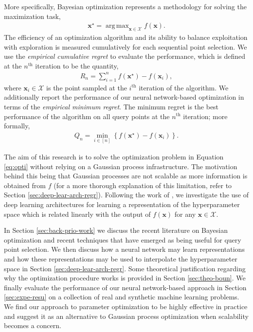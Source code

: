 \documentclass[]{article}
\DeclareMathOperator*{\argmax}{arg\,max}
\newcommand{\paren}[1]{\left({#1}\right)}
\newcommand{\brac}[1]{\left[{#1}\right]}
\newcommand{\set}[1]{\left\{{#1}\right\}}
\newcommand{\1}{\mathbf{1}}
\newcommand{\0}{\mathbf{0}}
\newcommand{\X}{\mathcal{X}}
\newcommand{\x}{\mathbf{x}}
\begin{document}
More specifically, Bayesian optimization represents a methodology for solving the maximization task,
\begin{eqnarray}
	\label{eq:opti}
	\x^\star = \argmax_{\x\in\X} f\paren{\x}.
\end{eqnarray}
The efficiency of an optimization algorithm and its ability to balance exploitation with exploration is measured cumulatively for each sequential point selection. We use the \textit{empirical cumulative regret} to evaluate the performance, which is defined at the $n^{\text{th}}$ iteration to be the quantity,
\begin{eqnarray}
	R_n = \sum_{i=1}^n f\paren{\x^\star} - f\paren{\x_i},	
\end{eqnarray}
where $\x_i\in \X$ is the point sampled at the $i^{\text{th}}$ iteration of the algorithm. We additionally report the performance of our neural network-based optimization in terms of the \textit{empirical minimum regret}. The minimum regret is the best performance of the algorithm on all query points at the $n^{\text{th}}$ iteration; more formally,
\begin{eqnarray}
	Q_n = \min_{i\in\brac{n}}\set{f\paren{\x^\star} - f\paren{\x_i}}.
\end{eqnarray}

The aim of this research is to solve the optimization problem in Equation \ref{eq:opti} without relying on a Gaussian process infrastructure. The motivation behind this being that Gaussian processes are not scalable as more information is obtained from $f$ (for a more thorough explanation of this limitation, refer to Section \ref{sec:deep-lear-arch-regr}). Following the work of \cite{snoek-scalable}, we investigate the use of deep learning architectures for learning a representation of the hyperparameter space which is related linearly with the output of $f\paren{\x}$ for any $\x\in\X$. 

In Section \ref{sec:back-prio-work} we discuss the recent literature on Bayesian optimization and recent techniques that have emerged as being useful for query point selection. We then discuss how a neural network may learn representations and how these representations may be used to interpolate the hyperparameter space in Section \ref{sec:deep-lear-arch-regr}. Some theoretical justification regarding why the optimization procedure works is provided in Section \ref{sec:theo-boun}. We finally evaluate the performance of our neural network-based approach in Section \ref{sec:expe-resu} on a collection of real and synthetic machine learning problems. We find our approach to parameter optimization to be highly effective in practice and suggest it as an alternative to Gaussian process optimization when scalability becomes a concern. 
\end{document}
